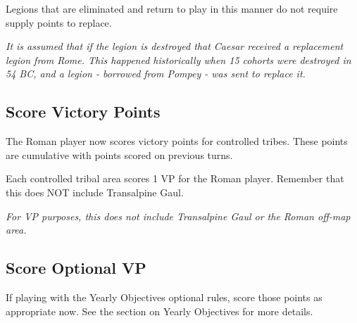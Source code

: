Legions that are eliminated and return to play in this manner do not require supply points to replace.

\textit{It is assumed that if the legion is destroyed that Caesar received a replacement legion from Rome. This happened historically when 15 cohorts were destroyed in 54 BC, and a legion - borrowed from Pompey - was sent to replace it.}

\subsection{Score Victory Points}
\par
The Roman player now scores victory points for controlled tribes. These points are cumulative with points scored on previous turns.

Each controlled tribal area scores 1 VP for the Roman player. Remember that this does NOT include Transalpine Gaul.

\textit{For VP purposes, this does not include Transalpine Gaul or the Roman off-map area.}

\subsection{Score Optional VP}
If playing with the Yearly Objectives optional rules, score those points as appropriate now. See the section on Yearly Objectives for more details.
